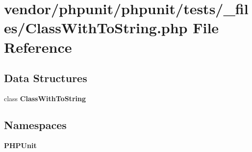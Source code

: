 \section{vendor/phpunit/phpunit/tests/\+\_\+files/\+Class\+With\+To\+String.php File Reference}
\label{phpunit_2phpunit_2tests_2__files_2_class_with_to_string_8php}
\subsection*{Data Structures}
\begin{DoxyCompactItemize}
\item 
class {\bf Class\+With\+To\+String}
\end{DoxyCompactItemize}
\subsection*{Namespaces}
\begin{DoxyCompactItemize}
\item 
 {\bf P\+H\+P\+Unit}
\end{DoxyCompactItemize}
